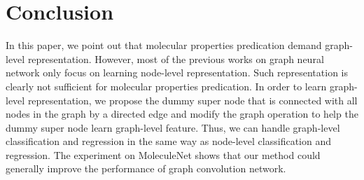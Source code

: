 \documentclass[letterpaper]{article} \usepackage{aaai18}  \usepackage{times}  \usepackage{helvet}  \usepackage{courier}  \usepackage{url}  \usepackage{graphicx}  \usepackage{amsmath}
\begin{document}
\FloatBarrier
\section{Conclusion}
In this paper, we point out that molecular properties predication demand graph-level representation. However, most of the previous works on graph neural network only focus on learning node-level representation. Such representation is clearly not sufficient for molecular properties predication. In order to learn graph-level representation, we propose the dummy super node that is connected with all nodes in the graph by a directed edge and modify the graph operation to help the dummy super node learn graph-level feature. Thus, we can handle graph-level classification and regression in the same way as node-level classification and regression. The experiment on MoleculeNet shows that our method could generally improve the performance of graph convolution network. 


\end{document}
